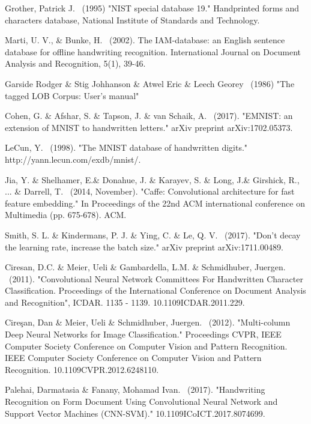 \documentclass{article}
\begin{document}
\begin{thebibliography}{99}
   Grother, Patrick J. \ (1995) "NIST special database 19." Handprinted forms and characters database, National Institute of Standards and Technology.

   Marti, U. V., \& Bunke, H. \ (2002). The IAM-database: an English sentence database for offline handwriting recognition. International Journal on Document Analysis and Recognition, 5(1), 39-46.

   Garside Rodger \& Stig Johhanson \& Atwel Eric \& Leech Georey \ (1986) "The tagged LOB Corpus: User's manual"

   Cohen, G. \& Afshar, S. \& Tapson, J. \& van Schaik, A. \ (2017). "EMNIST: an extension of MNIST to handwritten letters." arXiv preprint arXiv:1702.05373.

   LeCun, Y. \ (1998). "The MNIST database of handwritten digits." http://yann.lecun.com/exdb/mnist/.

   Jia, Y. \& Shelhamer, E.\& Donahue, J. \& Karayev, S. \& Long, J.\& Girshick, R., ... \& Darrell, T. \ (2014, November). "Caffe: Convolutional architecture for fast feature embedding." In Proceedings of the 22nd ACM international conference on Multimedia (pp. 675-678). ACM.

   Smith, S. L. \& Kindermans, P. J. \& Ying, C. \& Le, Q. V. \ (2017). "Don't decay the learning rate, increase the batch size." arXiv preprint arXiv:1711.00489.

   Ciresan, D.C. \& Meier, Ueli \& Gambardella, L.M. \& Schmidhuber, Juergen. \ (2011). "Convolutional Neural Network Committees For Handwritten Character Classification. Proceedings of the International Conference on Document Analysis and Recognition", ICDAR. 1135 - 1139. 10.1109\/ICDAR.2011.229.

   Cireşan, Dan \& Meier, Ueli \& Schmidhuber, Juergen. \ (2012). "Multi-column Deep Neural Networks for Image Classification." Proceedings  CVPR, IEEE Computer Society Conference on Computer Vision and Pattern Recognition. IEEE Computer Society Conference on Computer Vision and Pattern Recognition. 10.1109\/CVPR.2012.6248110.

   Palehai, Darmatasia \& Fanany, Mohamad Ivan. \ (2017). "Handwriting Recognition on Form Document Using Convolutional Neural Network and Support Vector Machines (CNN-SVM)." 10.1109\/ICoICT.2017.8074699.


\end{thebibliography}
\end{document}
